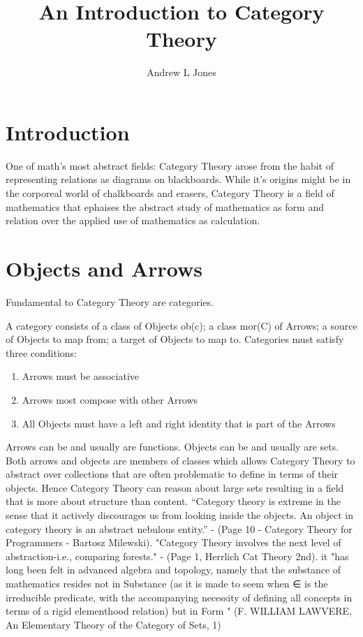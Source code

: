 \documentclass{article}
\title{An Introduction to Category Theory}
\author{Andrew L Jones}\date{}
\begin{document}
\maketitle



\section*{Introduction}
One of math's most abstract fields: Category Theory arose from the habit of representing relations as diagrams on blackboards. While it's origins might be in the corporeal world of chalkboards and erasers, Category Theory is a field of mathematics that ephaises the abstract study of mathematics as form and relation over the applied use of mathematics as calculation.


\section{Objects and Arrows}
Fundamental to Category Theory are categories.
\begin{definition}
A category consists of a class of Objects ob(c); a class mor(C) of Arrows; a source of Objects to map from; a target of Objects to map to. Categories must satisfy three conditions:
  \begin{enumerate}
    \item Arrows must be associative
    \item Arrows most compose with other Arrows
    \item All Objects must have a left and right identity that is part of the Arrows
  \end{enumerate}
\end{definition}
Arrows can be and usually are functions. Objects can be and usually are sets. Both arrows and objects are members of classes which allows Category Theory to abstract over collections that are often problematic to define in terms of their objects. Hence Category Theory can reason about large sets resulting in a field that is more about structure than content. “Category theory is extreme in the sense that it actively discourages us from looking inside the objects. An object in category theory is an abstract nebulous entity.” - (Page 10 - Category Theory for Programmers - Bartosz Milewski). "Category Theory involves the next level of abstraction-i.e., comparing forests." - (Page 1, Herrlich Cat Theory 2nd).
it "has long been felt in advanced algebra and topology, namely that the substance of mathematics resides not in Substance (as it is made to seem when ∈ is the irreducible predicate, with the accompanying necessity of defining all concepts in terms of a rigid elementhood relation) but in Form " (F. WILLIAM LAWVERE, An Elementary Theory
of the Category of Sets, 1)
\end{document}
